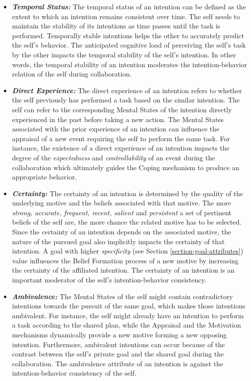 \documentclass[letterpaper]{article}
\begin{document}
\begin{itemize}
  \item \textbf{\textit{Temporal Status:}} The temporal status of an intention
  can be defined as the extent to which an intention remains consistent over
  time. The self needs to maintain the stability of its intentions as time
  passes until the task is performed. Temporally stable intentions helps the
  other to accurately predict the self's behavior. The anticipated cognitive
  load of perceiving the self's task by the other impacts the temporal stability
  of the self's intention. In other words, the temporal stability of an
  intention moderates the intention-behavior relation of the self during
  collaboration.
  
  \item \textbf{\textit{Direct Experience:}} The direct experience of an
  intention refers to whether the self previously has performed a task based on
  the similar intention. The self can refer to the corresponding Mental States
  of the intention directly experienced in the past before taking a new action.
  The Mental States associated with the prior experience of an intention can
  influence the appraisal of a new event requiring the self to perform the same
  task. For instance, the existence of a direct experience of an intention
  impacts the degree of the \textit{expectedness} and \textit{controllability}
  of an event during the collaboration which ultimately guides the Coping
  mechanism to produce an appropriate behavior.
  
  \item \textbf{\textit{Certainty:}} The certainty of an intention is determined
  by the quality of the underlying motive and the beliefs associated with that
  motive. The more \textit{strong, accurate, frequent, recent, salient} and
  \textit{persistent} a set of pertinent beliefs of the self are, the more
  chance the related motive has to be selected. Since the certainty of an
  intention depends on the associated motive, the nature of the pursued goal also
  implicitly impacts the certainty of that intention. A goal with higher
  \textit{specificity} (see Section \ref{section-goal-attributes}) value
  influences the Belief Formation process of a new motive by increasing the
  certainty of the affiliated intention. The certainty of an intention is an
  important moderator of the self's intention-behavior consistency.
  
  \item \textbf{\textit{Ambivalence:}} The Mental States of the self might
  contain contradictory intentions towards the pursuit of the same goal, which
  makes those intentions ambivalent. For instance, the self might already have
  an intention to perform a task according to the shared plan, while the Appraisal
  and the Motivation mechanisms dynamically provide a new motive forming a new
  opposing intention. Furthermore, ambivalent intentions can occur because of
  the contrast between the self's private goal and the shared goal during the
  collaboration. The ambivalence attribute of an intention is against the
  intention-behavior consistency of the self.
  

\end{itemize}
\end{document}
